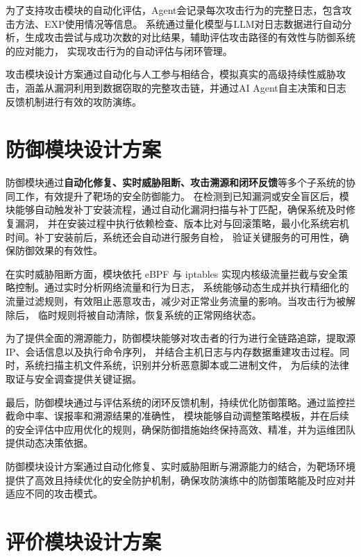 \documentclass[lang=cn,10pt]{elegantbook}
\begin{document}
为了支持攻击模块的自动化评估，Agent会记录每次攻击行为的完整日志，包含攻击方法、EXP使用情况等信息。
系统通过量化模型与LLM对日志数据进行自动分析，生成攻击尝试与成功次数的对比结果，辅助评估攻击路径的有效性与防御系统的应对能力，
实现攻击行为的自动评估与闭环管理。

\begin{definition}
攻击模块设计方案通过自动化与人工参与相结合，模拟真实的高级持续性威胁攻击，涵盖从漏洞利用到数据窃取的完整攻击链，并通过AI Agent自主决策和日志反馈机制进行有效的攻防演练。
\end{definition}

\section{防御模块设计方案}

防御模块通过\textbf{自动化修复、实时威胁阻断、攻击溯源和闭环反馈}等多个子系统的协同工作，有效提升了靶场的安全防御能力。
在检测到已知漏洞或安全盲区后，模块能够自动触发补丁安装流程，通过自动化漏洞扫描与补丁匹配，确保系统及时修复漏洞，
并在安装过程中执行依赖检查、版本比对与回滚策略，最小化系统宕机时间。补丁安装前后，系统还会自动进行服务自检，
验证关键服务的可用性，确保防御效果的有效性。

在实时威胁阻断方面，模块依托 eBPF 与 iptables 实现内核级流量拦截与安全策略控制。通过实时分析网络流量和行为日志，
系统能够动态生成并执行精细化的流量过滤规则，有效阻止恶意攻击，减少对正常业务流量的影响。当攻击行为被解除后，
临时规则将被自动清除，恢复系统的正常网络状态。

为了提供全面的溯源能力，防御模块能够对攻击者的行为进行全链路追踪，提取源 IP、会话信息以及执行命令序列，
并结合主机日志与内存数据重建攻击过程。同时，系统扫描主机文件系统，识别并分析恶意脚本或二进制文件，
为后续的法律取证与安全调查提供关键证据。

最后，防御模块通过与评估系统的闭环反馈机制，持续优化防御策略。通过监控拦截命中率、误报率和溯源结果的准确性，
模块能够自动调整策略模板，并在后续的安全评估中应用优化的规则，确保防御措施始终保持高效、精准，并为运维团队提供动态决策依据。


\begin{definition}
防御模块设计方案通过自动化修复、实时威胁阻断与溯源能力的结合，为靶场环境提供了高效且持续优化的安全防护机制，确保攻防演练中的防御策略能及时应对并适应不同的攻击模式。
\end{definition}


\section{评价模块设计方案}
\end{document}

